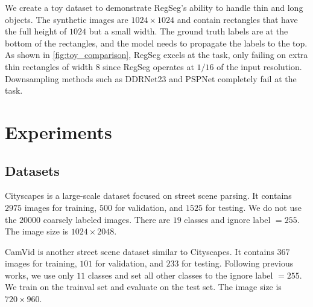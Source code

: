 \documentclass[10pt,twocolumn,letterpaper]{article}
\begin{document}
We create a toy dataset to demonstrate RegSeg's ability to handle thin and long objects. The synthetic images are $1024\times 1024$ and contain rectangles that have the full height of $1024$ but a small width. The ground truth labels are at the bottom of the rectangles, and the model needs to propagate the labels to the top. As shown in \cref{fig:toy_comparison}, RegSeg excels at the task, only failing on extra thin rectangles of width 8 since RegSeg operates at $1/16$ of the input resolution. Downsampling methods such as DDRNet23\cite{ddrnet} and PSPNet\cite{pspnet} completely fail at the task.

\section{Experiments}

\subsection{Datasets}
Cityscapes\cite{cityscapes} is a large-scale dataset focused on street scene parsing. It contains $2975$ images for training, $500$ for validation, and $1525$ for testing. We do not use the $20000$ coarsely labeled images. There are $19$ classes and ignore label $=255$. The image size is $1024\times 2048$.

CamVid\cite{camvid} is another street scene dataset similar to Cityscapes. It contains $367$ images for training, $101$ for validation, and $233$ for testing. Following previous works\cite{dfanet,bisenetv1,swiftnet}, we use only $11$ classes and set all other classes to the ignore label $=255$. We train on the trainval set and evaluate on the test set. The image size is $720\times 960$.
\end{document}

